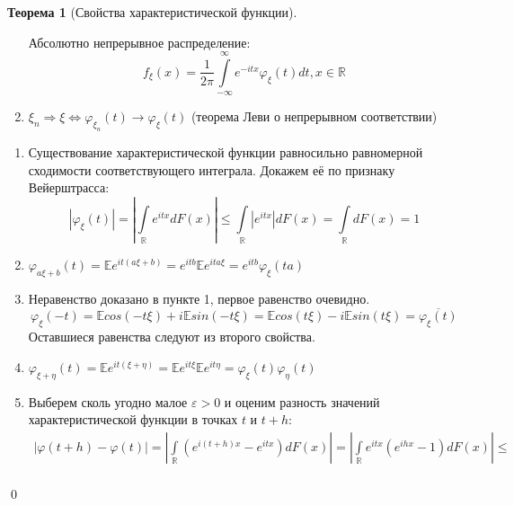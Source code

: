 \documentclass[oneside,final,14pt]{extreport}
\renewenvironment{proof}{{\bfseries Доказательство.}}{\qed}
\theoremstyle{plain}
\theoremstyle{definition}
\theoremstyle{named}
\newtheorem*{namedthm}{Теорема}
\begin{document}
\begin{namedthm}[Свойства характеристической функции]
\begin{enumerate}
        Абсолютно непрерывное распределение:
        \begin{equation*}
            f_{\xi}(x)=\frac{1}{2 \pi} \int\limits_{-\infty}^{\infty} e^{-i t x} \varphi_{\xi}(t) d t, x \in \mathbb{R}
        \end{equation*}
    \item $\xi_n \Rightarrow \xi \Leftrightarrow \varphi_{\xi_{n}}(t) \to \varphi_{\xi}(t)$ (теорема Леви о непрерывном соответствии)
    \end{enumerate}
\end{namedthm}

\begin{proof}
    \begin{enumerate}
        \item Существование характеристической функции равносильно равномерной сходимости соответствующего интеграла. Докажем её по признаку Вейерштрасса:
        \begin{equation*}
            \left|\varphi_{\xi}(t)\right|=\left|\int\limits_{\mathbb{R}} e^{i t x} d F(x)\right| \leqslant \int\limits_{\mathbb{R}}\left|e^{i t x}\right| d F(x)=\int\limits_{\mathbb{R}} d F(x)=1
        \end{equation*}
        \item $\varphi_{a \xi+b}(t) 
        = \mathbb{E}e^{i t(a \xi+b)}
        = e^{i t b} \mathbb{E}e^{i t a \xi}
        = e^{i t b} \varphi_{\xi}(t a)$
        \item Неравенство доказано в пункте 1, первое равенство очевидно.
        \begin{equation*}
            \varphi_{\xi}(-t) = \mathbb{E}cos(-t \xi) + i\mathbb{E}sin(-t \xi) = \mathbb{E}cos(t \xi) - i\mathbb{E}sin(t \xi) = \overline{\varphi_{\xi}(t)}
        \end{equation*}
        Оставшиеся равенства следуют из второго свойства.
        \item $\varphi_{\xi + \eta}(t) 
        = \mathbb{E}e^{it(\xi + \eta)} 
        = \mathbb{E}e^{it\xi}\mathbb{E}e^{it\eta}
        = \varphi_{\xi}(t)\varphi_{\eta}(t)$
        \item Выберем сколь угодно малое $\varepsilon > 0$ и оценим разность значений характеристической функции в точках $t$ и $t + h$:
        \begin{multline*}
            |\varphi(t+h)-\varphi(t)| 
            = \left|\int\limits_{\mathbb{R}} \left(e^{i(t+h) x}-e^{i tx}\right) d F(x)\right|
            = \left|\int\limits_{\mathbb{R}} e^{i t x}\left(e^{i h x}-1\right) d F(x)\right| \leqslant \\

\end{multline*}
\end{enumerate}
\end{proof}
\end{document}
